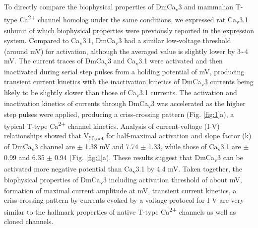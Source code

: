 To directly compare the biophysical properties of DmCa\textsubscript{v}3 and mammalian T-type Ca\textsuperscript{2+} channel homolog under the same conditions, we expressed rat Ca\textsubscript{v}3.1 subunit of which biophysical properties were previously reported in the expression system\cite{PerezReyes:1998gn}.
Compared to Ca\textsubscript{v}3.1, DmCa\textsubscript{v}3 had a similar low-voltage threshold (around  mV) for activation, although the averaged value is slightly lower by 3\sim 4 mV.
The current traces of DmCa\textsubscript{v}3 and Ca\textsubscript{v}3.1 were activated and then inactivated during serial step pulses from a holding potential of  mV, producing transient current kinetics with the inactivation kinetics of DmCa\textsubscript{v}3 currents being likely to be slightly slower than those of Ca\textsubscript{v}3.1 currents.
The activation and inactivation kinetics of currents through DmCa\textsubscript{v}3 was accelerated as the higher step pulses were applied, producing a criss-crossing pattern (Fig. \ref{fig:1}a), a typical T-type Ca\textsuperscript{2+} channel kinetics.
Analysis of current-voltage (I-V) relationships showed that V\textsubscript{50,act} for half-maximal activation and slope factor (k) of DmCa\textsubscript{v}3 channel are  $\pm$ 1.38 mV and 7.74 $\pm$ 1.33, while those of Ca\textsubscript{v}3.1 are  $\pm$ 0.99 and 6.35 $\pm$ 0.94 (Fig. \ref{fig:1}a).
These results suggest that DmCa\textsubscript{v}3 can be activated more negative potential than Ca\textsubscript{v}3.1 by 4.4 mV.
Taken together, the biophysical properties of DmCa\textsubscript{v}3 including activation threshold of about  mV, formation of maximal current amplitude at  mV, transient current kinetics, a criss-crossing pattern by currents evoked by a voltage protocol for I-V are very similar to the hallmark properties of native T-type Ca\textsuperscript{2+} channels as well as cloned channels\cite{PerezReyes:1998gn, carbone:1984aa, Cribbs:1998vc, 10066244}.

